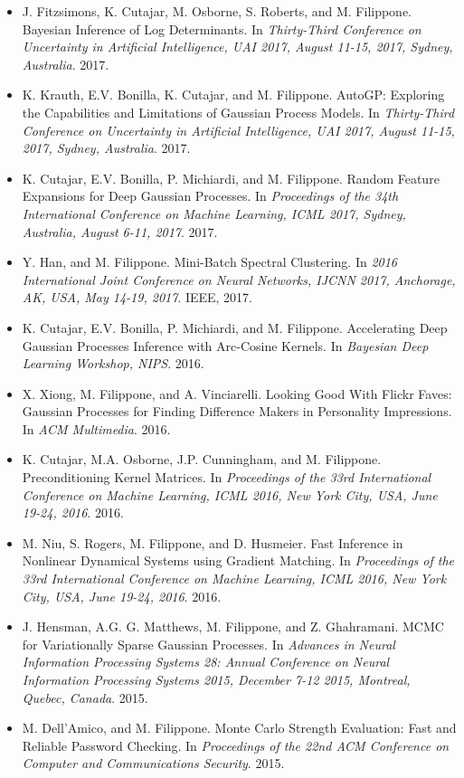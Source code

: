 \begin{itemize}
\item  J. Fitzsimons, K. Cutajar, M. Osborne, S. Roberts, and M. Filippone. {Bayesian Inference of Log Determinants}. In \emph{Thirty-Third Conference on Uncertainty in Artificial Intelligence, {UAI} 2017, August 11-15, 2017, Sydney, Australia}. 2017.
\item  K. Krauth, E.V. Bonilla, K. Cutajar, and M. Filippone. {AutoGP}: {E}xploring the Capabilities and Limitations of {G}aussian Process Models. In \emph{Thirty-Third Conference on Uncertainty in Artificial Intelligence, {UAI} 2017, August 11-15, 2017, Sydney, Australia}. 2017.
\item  K. Cutajar, E.V. Bonilla, P. Michiardi, and M. Filippone. Random Feature Expansions for Deep {G}aussian Processes. In \emph{Proceedings of the 34th International Conference on Machine Learning, ICML 2017, Sydney, Australia, August 6-11, 2017}. 2017.
\item  Y. Han, and M. Filippone. Mini-Batch Spectral Clustering. In \emph{2016 International Joint Conference on Neural Networks, {IJCNN} 2017, Anchorage, AK, USA, May 14-19, 2017}. {IEEE}, 2017.
\item  K. Cutajar, E.V. Bonilla, P. Michiardi, and M. Filippone. Accelerating Deep {G}aussian Processes Inference with Arc-Cosine Kernels. In \emph{Bayesian Deep Learning Workshop, NIPS}. 2016.
\item  X. Xiong, M. Filippone, and A. Vinciarelli. Looking Good With Flickr Faves: {G}aussian Processes for Finding Difference Makers in Personality Impressions. In \emph{ACM Multimedia}. 2016.
\item  K. Cutajar, M.A. Osborne, J.P. Cunningham, and M. Filippone. Preconditioning Kernel Matrices. In \emph{Proceedings of the 33rd International Conference on Machine Learning, ICML 2016, New York City, USA, June 19-24, 2016}. 2016.
\item  M. Niu, S. Rogers, M. Filippone, and D. Husmeier. Fast Inference in Nonlinear Dynamical Systems using Gradient Matching. In \emph{Proceedings of the 33rd International Conference on Machine Learning, ICML 2016, New York City, USA, June 19-24, 2016}. 2016.
\item  J. Hensman, A.G. G. Matthews, M. Filippone, and Z. Ghahramani. {MCMC} for Variationally Sparse {G}aussian Processes. In \emph{Advances in Neural Information Processing Systems 28: Annual Conference on Neural Information Processing Systems 2015, December 7-12 2015, Montreal, Quebec, Canada}. 2015.
\item  M. Dell'Amico, and M. Filippone. {M}onte {C}arlo Strength Evaluation: Fast and Reliable Password Checking. In \emph{Proceedings of the 22nd ACM Conference on Computer and Communications Security}. 2015.

\end{itemize}

